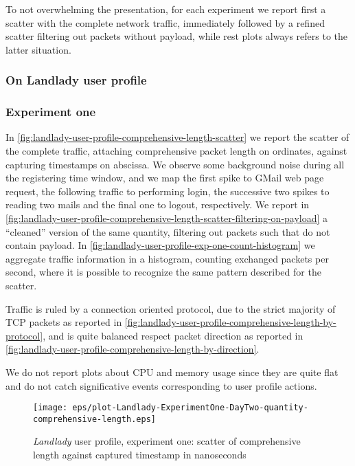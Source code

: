 \documentclass[10pt,a4paper]{article}
\begin{document}
    To not overwhelming the presentation, for each experiment we
    report first a scatter with the complete network traffic,
    immediately followed by a refined scatter filtering out packets
    without payload, while rest plots always refers to the latter
    situation.

    \subsubsection{On Landlady user profile}

    \subsubsection*{Experiment one}
    In
    \autoref{fig:landlady-user-profile-comprehensive-length-scatter}
    we report the scatter of the complete traffic, attaching
    comprehensive packet length on ordinates, against capturing
    timestamps on abscissa. We observe some background noise during
    all the registering time window, and we map the first spike to
    GMail web page request, the following traffic to performing login,
    the successive two spikes to reading two mails and the final one
    to logout, respectively. We report in
    \autoref{fig:landlady-user-profile-comprehensive-length-scatter-filtering-on-payload}
    a ``cleaned'' version of the same quantity, filtering out packets
    such that do not contain payload. In
    \autoref{fig:landlady-user-profile-exp-one-count-histogram} we
    aggregate traffic information in a histogram, counting exchanged
    packets per second, where it is possible to recognize the same
    pattern described for the scatter.

    Traffic is ruled by a connection oriented protocol, due to the
    strict majority of TCP packets as reported in
    \autoref{fig:landlady-user-profile-comprehensive-length-by-protocol},
    and is quite balanced respect packet direction as reported in
    \autoref{fig:landlady-user-profile-comprehensive-length-by-direction}.
    
    We do not report plots about CPU and memory usage since they are
    quite flat and do not catch significative events corresponding to
    user profile actions.

    \begin{figure}
      \centering
      \texttt{[image: eps/plot-Landlady-ExperimentOne-DayTwo-quantity-comprehensive-length.eps]}
      \caption{\emph{Landlady} user profile, experiment one:
        scatter of comprehensive length against captured timestamp in
        nanoseconds}
      \label{fig:landlady-user-profile-comprehensive-length-scatter}
    \end{figure}
\end{document}
